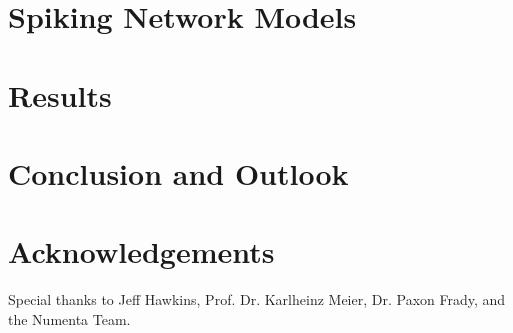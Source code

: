\documentclass{reporter}
\begin{document}
\section{Spiking Network Models}


\section{Results}


\section{Conclusion and Outlook}


\section*{Acknowledgements}

Special thanks to Jeff Hawkins, Prof. Dr. Karlheinz Meier, Dr. Paxon Frady,
and the Numenta Team.



%
%
%
%
%
%
%
\end{document}
